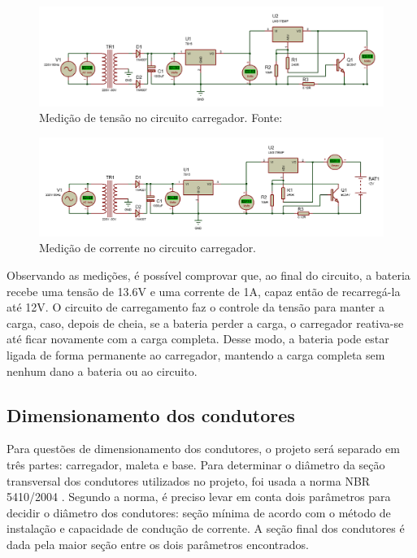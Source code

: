 \begin{figure}[!h]
	\centering
		\includegraphics[keepaspectratio=true,scale=0.5]{figuras/Medição - Tensão.PNG}
	\caption{Medição de tensão no circuito carregador. Fonte: \cite{retificador}}
	\label{fig:bateriatensao}
\end{figure}

\begin{figure}[!h]
	\centering
		\includegraphics[keepaspectratio=true,scale=0.5]{figuras/Medição - Corrente.PNG}
	\caption{Medição de corrente no circuito carregador.}
	\label{fig:bateriacorrente}
\end{figure}

Observando as medições, é possível comprovar que, ao final do circuito, a bateria recebe uma tensão de 13.6V e uma corrente de 1A, capaz então de recarregá-la até 12V. O circuito de carregamento faz o controle da tensão para manter a carga, caso, depois de cheia, se a bateria perder a carga, o carregador reativa-se até ficar novamente com a carga completa. Desse modo, a bateria pode estar ligada de forma permanente ao carregador, mantendo a carga completa sem nenhum dano a bateria ou ao circuito.

\subsection{Dimensionamento dos condutores}

Para questões de dimensionamento dos condutores, o projeto será separado em três partes: carregador, maleta e base. Para determinar o diâmetro da seção transversal dos condutores utilizados no projeto, foi usada a norma NBR 5410/2004 \cite{NBR5410}. Segundo a norma, é preciso levar em conta dois parâmetros para decidir o diâmetro dos condutores: seção mínima de acordo com o método de instalação e capacidade de condução de corrente. A seção final dos condutores é dada pela maior seção entre os dois parâmetros encontrados.

